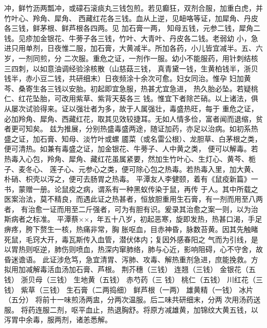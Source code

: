 \documentclass[a4paper,12pt,UTF8,twoside]{ctexbook}
\begin{document}
冲，鲜竹沥两瓢冲，或礞石滚痰丸三钱包煎。若见癫狂，双剂合服，加重白虎，并竹叶心、羚角、犀角、 
西藏红花各三钱。血从上逆，见衄咯等证，加犀角、丹皮各三钱，鲜茅根、鲜芦根各四两。见 加石膏一两， 
知母五钱，元参二钱，犀角二钱。见疹加金银花、牛蒡子各三钱，竹叶、大青叶、丹皮各二钱。老弱幼 
小，急进只用单剂，日夜惟二服，加石膏，大黄减半。所加各药，小儿皆宜减半。五、六岁，一剂同煎，分 
二次服。重危之证，一剂作一服。幼小不能服药，用针刺结核三四刺，以如意油调经验涂核散（山慈菇三钱， 
真青黛一钱，生黄柏钱半，浙贝钱半，赤小豆二钱，共研细末）日夜频涂十余次可愈。妇女同治。惟孕 
妇加黄芩、桑寄生各三钱以安胎。初起即宜急服，热甚尤宜急进， 
热久胎必坠。若疑桃仁、红花坠胎，可改用紫草、紫背天葵各三 
钱。惟宜下者除芒硝。以上诸法，俱从屡次试验得来。证以强壮者为多，故于人属强壮，毒盛热旺，每于 
重危之证，必加羚角、犀角、西藏红花，取其见效较捷耳。无如人情多俭，富者闻而退缩，贫者更可知矣。 
兹为推展，分别热盛毒盛两途，随证加药，亦足以治病。如初系热盛之证，加石膏、知母、淡竹叶或螺 
靥菜（或名雷公根）、龙胆草、白茅根之类，便可清热。如兼有毒盛之证，加金银花、牛蒡子、人中黄之类， 
便可以解毒。若热毒入心包，羚角、犀角、藏红花虽属紧要，然加生竹叶心、生灯心、黄芩、栀子、麦冬心、 
莲子心、元参心之类，便可除心包之热毒。若热毒入里，加大黄、朴硝、枳壳以泻之，便可去肠胃之热毒。 
平潭友人李健颐，着有《鼠疫新篇》一书，蒙赠一册。论鼠疫之病，谓系有一种黑蚁传染于鼠，再传 
于人。其中所载之医案治法，莫不精良，而遇此证之热甚者，恒放胆重用生石膏，有一剂而用至八两者， 
有治愈一证而用至二斤强者，可为有胆有识。爰录其治愈之案一则，以为治斯病者之标准。 
平潭蔡××，年五十八岁，初起恶寒，旋即发热，热甚口渴，手足痹疼，胯下赘生一核，热痛非常，胸 
胀呕血，目赤神昏，脉数苔黄。因其先触睹死鼠，毛窍大开，毒瓦斯传入血管，潜伏体内；复因外感春阳之 
气而为引线，是以胃热则呕逆，肺伤则喷血，热深内窜肺络，肺与心近，影响阻碍，心不守舍，故昏迷谵语。 
此证涉危笃，急宜清胃、泻肺、攻毒、解热重剂急进，庶能挽救。方拟用加减解毒活血汤加石膏、芦根。 
荆芥穗（三钱） 连翘（三钱） 金银花（五钱） 浙贝母（三钱） 生地黄（五钱） 赤芍药（三 
钱） 桃仁（五钱） 川红花（三钱） 紫草（三钱） 生石膏（二两捣细） 鲜芦根（一两） 
雄黄精（一钱） 冰片（五分） 
将前十一味煎汤两盅，分两次温服。后二味共研细末，分两 
次用汤药送服。 
将药连服二剂，呕平血止，热退胸舒。将原方减雄黄，加锦纹大黄五钱，以泻胃中余毒，服两剂，诸恙悉解。 
\end{document}
